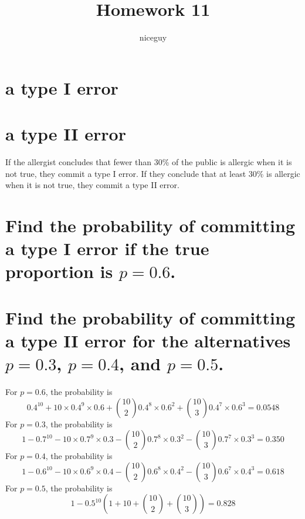 \documentclass[answers]{exam}
\author{niceguy}
\title{Homework 11}
\begin{document}
\maketitle

\begin{questions}


\begin{parts}
    \part{a type I error}
    \part{a type II error}
\end{parts}

\begin{solution}
    If the allergist concludes that fewer than 30\% of the public is allergic when it is not true, they commit a type I error. If they conclude that at least 30\% is allergic when it is not true, they commit a type II error.
\end{solution}


\begin{parts}
    \part{Find the probability of committing a type I error if the true proportion is $p = 0.6$.}
    \part{Find the probability of committing a type II error for the alternatives $p = 0.3$, $p = 0.4$, and $p = 0.5$.}
\end{parts}

\begin{solution}
    For $p = 0.6$, the probability is
    $$0.4^{10} + 10\times0.4^9\times0.6 + \binom{10}{2} 0.4^8\times0.6^2 + \binom{10}{3} 0.4^7\times0.6^3 = 0.0548$$
    For $p = 0.3$, the probability is
    $$1 - 0.7^{10} - 10\times0.7^9\times0.3 - \binom{10}{2} 0.7^8\times0.3^2 - \binom{10}{3} 0.7^7\times0.3^3 = 0.350$$
    For $p = 0.4$, the probability is
    $$1 - 0.6^{10} - 10\times0.6^9\times0.4 - \binom{10}{2} 0.6^8\times0.4^2 - \binom{10}{3} 0.6^7\times0.4^3 = 0.618$$
    For $p = 0.5$, the probability is
    $$1 - 0.5^{10}\left(1 + 10 + \binom{10}{2} + \binom{10}{3}\right) = 0.828$$
\end{solution}


\end{questions}
\end{document}
